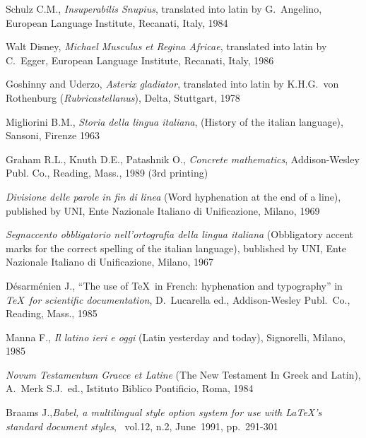 \normalsize
\begin{thebibliography}{99}

  Schulz  C.M., {\it Insuperabilis Snupius}, translated into
latin by G.~Angelino, European Language Institute, Recanati, Italy, 1984

  Walt  Disney,  {\it  Michael  Musculus et Regina Africae},
translated into latin by C.~Egger, European  Language  Institute,  Recanati,
Italy, 1986

  Goshinny  and Uderzo, {\it Asterix gladiator}, translated
into latin  by  K.H.G.~von  Rothenburg  ({\it  Rubricastellanus\/}),  Delta,
Stuttgart, 1978

  Migliorini  B.M.,  {\it Storia della lingua italiana},
(History of the italian language), Sansoni, Firenze 1963

  Graham  R.L.,  Knuth  D.E.,  Patashnik  O.,  {\it  Concrete
mathematics}, Addison-Wesley Publ. Co., Reading, Mass., 1989 (3rd printing)

    {\it  Divisione  delle  parole  in  fin  di  linea}  (Word
hyphenation at the end of a line), published by UNI, Ente Nazionale Italiano
di Unificazione, Milano, 1969

  {\it  Segnaccento  obbligatorio nell'ortografia della lingua
italiana} (Obbligatory accent marks for the correct spelling of the  italian
language),  bublished  by  UNI,  Ente  Nazionale  Italiano  di Unificazione,
Milano, 1967

  D\'esarm\'enien  J.,  ``The  use  of \TeX\ in French:
hyphenation and typography'' in {\it \TeX\  for  scientific  documentation},
D.~Lucarella ed., Addison-Wesley Publ.\ Co., Reading, Mass., 1985

  Manna  F., {\it Il latino ieri e oggi} (Latin yesterday and
today), Signorelli, Milano, 1985

  {\it  Novum Testamentum Graece et Latine} (The New Testament
In Greek and Latin),  A.~Merk S.J.\ ed., Istituto Biblico Pontificio,  Roma,
1984

  Braams  J.,{\it  Babel, a multilingual style option system
for  use  with  \LaTeX's  standard  document  styles},  \TUB\  vol.12,  n.2,
June~1991, pp.~291-301

\end{thebibliography}

\makesignature


